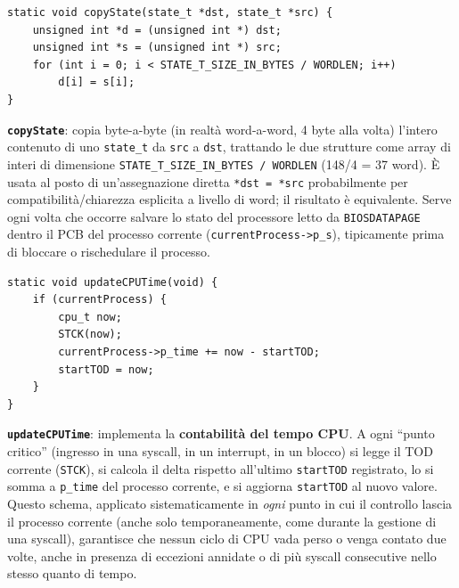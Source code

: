 \documentclass[11pt,a4paper]{article}
\newcommand{\code}[1]{\texttt{#1}}
\newcommand{\func}[1]{\textbf{\texttt{#1}}}
\begin{document}
\begin{lstlisting}
static void copyState(state_t *dst, state_t *src) {
    unsigned int *d = (unsigned int *) dst;
    unsigned int *s = (unsigned int *) src;
    for (int i = 0; i < STATE_T_SIZE_IN_BYTES / WORDLEN; i++)
        d[i] = s[i];
}
\end{lstlisting}
\func{copyState}: copia byte-a-byte (in realtà word-a-word, 4 byte alla
volta) l'intero contenuto di uno \code{state\_t} da \code{src} a
\code{dst}, trattando le due strutture come array di interi di dimensione
\code{STATE\_T\_SIZE\_IN\_BYTES / WORDLEN} (148/4 = 37 word). È usata al
posto di un'assegnazione diretta \code{*dst = *src} probabilmente per
compatibilità/chiarezza esplicita a livello di word; il risultato è
equivalente. Serve ogni volta che occorre salvare lo stato del processore
letto da \code{BIOSDATAPAGE} dentro il PCB del processo corrente
(\code{currentProcess->p\_s}), tipicamente prima di bloccare o rischedulare
il processo.

\begin{lstlisting}
static void updateCPUTime(void) {
    if (currentProcess) {
        cpu_t now;
        STCK(now);
        currentProcess->p_time += now - startTOD;
        startTOD = now;
    }
}
\end{lstlisting}
\func{updateCPUTime}: implementa la \textbf{contabilità del tempo CPU}. A
ogni ``punto critico'' (ingresso in una syscall, in un interrupt, in un
blocco) si legge il TOD corrente (\code{STCK}), si calcola il delta rispetto
all'ultimo \code{startTOD} registrato, lo si somma a \code{p\_time} del
processo corrente, e si aggiorna \code{startTOD} al nuovo valore. Questo
schema, applicato sistematicamente in \emph{ogni} punto in cui il controllo
lascia il processo corrente (anche solo temporaneamente, come durante la
gestione di una syscall), garantisce che nessun ciclo di CPU vada perso o
venga contato due volte, anche in presenza di eccezioni annidate o di più
syscall consecutive nello stesso quanto di tempo.
\end{document}
